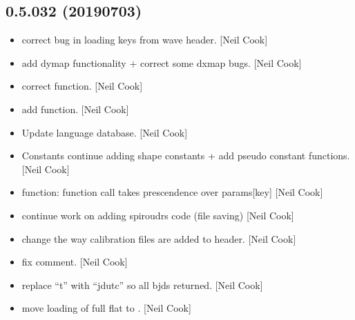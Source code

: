 \documentclass[a4paper,10pt,english]{report}
\begin{document}
\subsection{0.5.032 (2019\sphinxhyphen{}07\sphinxhyphen{}03)}
\label{\detokenize{misc/changelog:id125}}\begin{itemize}
\item {} 
 \sphinxhyphen{} correct bug in loading keys from wave header.
{[}Neil Cook{]}

\item {} 
 \sphinxhyphen{} add dymap functionality + correct some dxmap
bugs. {[}Neil Cook{]}

\item {} 
 \sphinxhyphen{} correct  function.
{[}Neil Cook{]}

\item {} 
 \sphinxhyphen{} add  function. {[}Neil
Cook{]}

\item {} 
Update language database. {[}Neil Cook{]}

\item {} 
Constants \sphinxhyphen{} continue adding shape constants + add pseudo constant
functions. {[}Neil Cook{]}

\item {} 
 \sphinxhyphen{}  function: function call takes prescendence
over params{[}key{]} {[}Neil Cook{]}

\item {} 
 \sphinxhyphen{} continue work on adding spiroudrs code
(file saving) {[}Neil Cook{]}

\item {} 
 \sphinxhyphen{} change the way calibration files are added to
header. {[}Neil Cook{]}

\item {} 
 \sphinxhyphen{} fix comment. {[}Neil Cook{]}

\item {} 
 \sphinxhyphen{} replace “t” with “jdutc” so all bjds returned. {[}Neil
Cook{]}

\item {} 
 \sphinxhyphen{} move loading of full flat to
. {[}Neil Cook{]}


\end{itemize}
\end{document}
